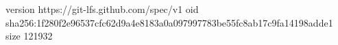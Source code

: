 version https://git-lfs.github.com/spec/v1
oid sha256:1f280f2e96537cfc62d9a4e8183a0a097997783be55fc8ab17c9fa14198adde1
size 121932
